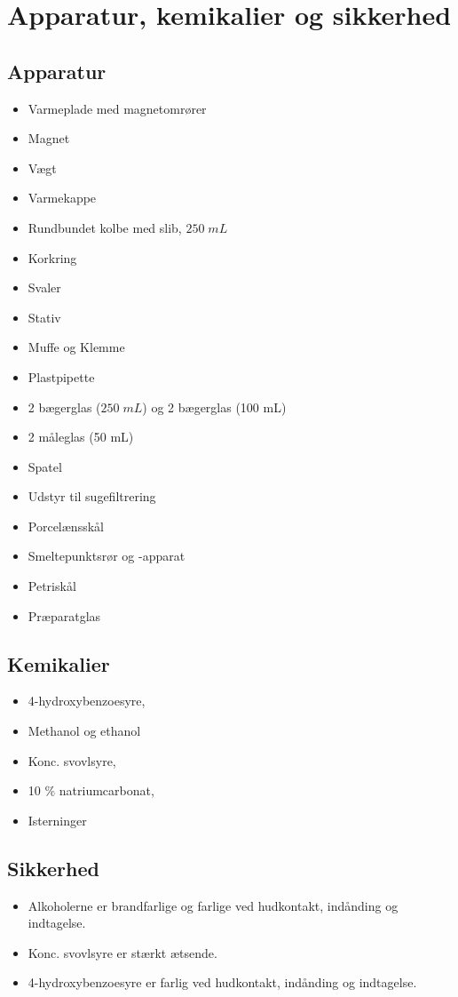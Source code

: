 \documentclass{report}
\begin{document}
\section*{Apparatur, kemikalier og sikkerhed}
\begin{multicols}{2}
\subsection*{Apparatur}
\begin{itemize}
  \item Varmeplade med magnetomrører 
\item Magnet
\item Vægt
\item Varmekappe
\item Rundbundet kolbe med slib, $250 \;\unit{mL} $
\item Korkring
\item Svaler
\item Stativ
\item Muffe og Klemme
\item Plastpipette
  \item 2 bægerglas ($250 \;\unit{mL} $) og 2 bægerglas (100 mL)
  \item 2 måleglas (50 mL)
\item Spatel
\item Udstyr til sugefiltrering
\item Porcelænsskål
\item Smeltepunktsrør og -apparat
\item Petriskål
\item Præparatglas
\end{itemize}
\end{multicols}
\subsection*{Kemikalier}
\begin{itemize}
  \item 4-hydroxybenzoesyre,  
  \item Methanol og ethanol
  \item Konc. svovlsyre,  
  \item 10 \% natriumcarbonat,  
  \item Isterninger    
\end{itemize}
\subsection*{Sikkerhed}
\begin{itemize}
  \item Alkoholerne er brandfarlige og farlige ved hudkontakt, indånding og indtagelse.
  \item Konc. svovlsyre er stærkt ætsende.
  \item 4-hydroxybenzoesyre er farlig ved hudkontakt, indånding og indtagelse. 
\end{itemize}
\end{document}
